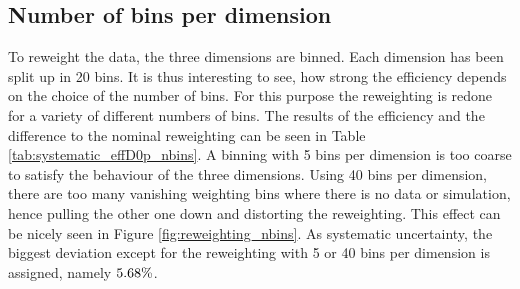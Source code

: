 \subsection{Number of bins per dimension}
To reweight the data, the three dimensions are binned.
Each dimension has been split up in 20 bins.
It is thus interesting to see, how strong the efficiency depends on the choice of the number of bins.
For this purpose the reweighting is redone for a variety of different numbers of bins.
The results of the efficiency \effDp and the difference to the nominal reweighting can be seen in Table \ref{tab:systematic_effD0p_nbins}.
A binning with 5 bins per dimension is too coarse to satisfy the behaviour of the three dimensions.
Using 40 bins per dimension, there are too many vanishing weighting bins where there is no data or simulation, hence pulling the other one down and distorting the reweighting.
This effect can be nicely seen in Figure \ref{fig:reweighting_nbins}.
As systematic uncertainty, the biggest deviation except for the reweighting with 5 or 40 bins per dimension is assigned, namely $5.68\%$.

